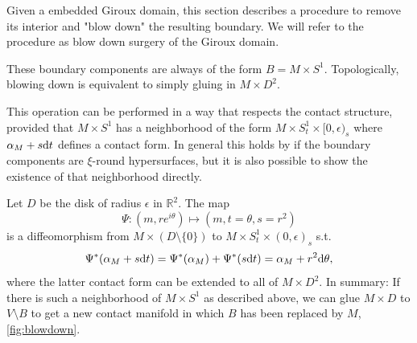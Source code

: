 Given a embedded Giroux domain, this section describes a procedure
to remove its interior and "blow down" the resulting boundary.
We will refer to the procedure as blow down surgery of the Giroux domain.

These boundary components are always of the form $B = M \times S^1$.
Topologically, blowing down is equivalent to simply gluing in $M\times D^2$.

This operation can be performed in a way that respects the contact structure,
provided that $M \times S^1$ has a neighborhood
of the form $M \times S^1_t \times [0, \epsilon)_s$ where $\alpha_M + s \mathrm{d} t$
defines a contact form.
In general this holds by \cite[Lemma 5.1]{MNW13} if the boundary components 
are $\xi$-round hypersurfaces, but it is also possible to show the existence 
of that neighborhood directly.

Let $D$ be the disk of radius $\epsilon$ in $\mathbb R^2$. The map 
\[
    \Psi \colon (m, re^{i\theta}) \mapsto (m, t = \theta, s = r^2)
\]
is a diffeomorphism from $M \times (D \setminus \{0\})$ to 
$M \times S^1_t \times (0, \epsilon)_s$ s.t.
\[
    \Psi^*(\alpha_M + s \mathrm{d} t) = \Psi^*(\alpha_M) + \Psi^*(s\mathrm{d} t) 
    = \alpha_M + r^2 \mathrm{d} \theta,
\]
where the latter contact form can be extended to all of $M \times D^2$.
In summary: If there is such a neighborhood of $M \times S^1$ as described above, 
we can glue $M \times D$ to $V \setminus B$ to get a new contact manifold 
in which $B$ has been replaced by $M$, \cref{fig:blowdown}.

